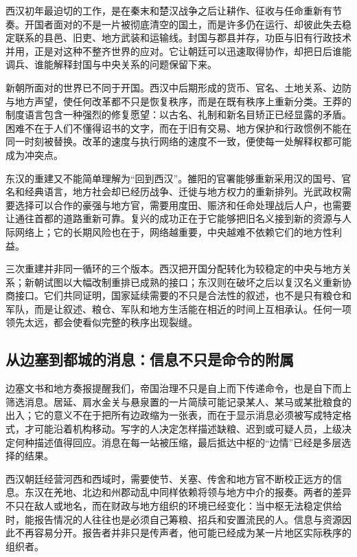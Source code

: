 西汉初年最迫切的工作，是在秦末和楚汉战争之后让耕作、征收与任命重新有节奏。开国者面对的不是一片被彻底清空的国土，而是许多仍在运行、却彼此失去稳定联系的县邑、旧吏、地方武装和运输线。封国与郡县并存，功臣与旧有行政技术并用，正是对这种不整齐世界的应对。它让朝廷可以迅速取得协作，却把日后谁能调兵、谁能解释封国与中央关系的问题保留下来。

新朝所面对的世界已不同于开国。西汉中后期形成的货币、官名、土地关系、边防与地方声望，使任何改革都不只是恢复秩序，而是在既有秩序上重新分类。王莽的制度语言包含一种强烈的修复愿望：以古名、礼制和新名目矫正已经显露的矛盾。困难不在于人们不懂得诏书的文字，而在于旧有交易、地方保护和行政惯例不能在同一时刻被替换。改革的速度与执行网络的速度不一致，便使每一处解释权都可能成为冲突点。

东汉的重建又不能简单理解为“回到西汉”。雒阳的官署能够重新采用汉的国号、官名和经典语言，地方社会却已经历战争、迁徙与地方权力的重新排列。光武政权需要选择可以合作的豪强与地方官，需要用度田、赈济和任命处理战后人户，也需要让通往首都的道路重新可靠。复兴的成功正在于它能够把旧名义接到新的资源与人际网络上；它的长期风险也在于，网络越重要，中央越难不依赖它们的地方性利益。

三次重建并非同一循环的三个版本。西汉把开国分配转化为较稳定的中央与地方关系；新朝试图以大幅改制重排已成熟的接口；东汉则在破坏之后以复汉名义重新协商接口。它们共同证明，国家延续需要的不只是合法性的叙述，也不是只有粮仓和军队，而是让叙述、粮仓、军队和地方生活能在相近的时间上互相承认。任何一项领先太远，都会使看似完整的秩序出现裂缝。

\subsection{从边塞到都城的消息：信息不只是命令的附属}

边塞文书和地方奏报提醒我们，帝国治理不只是自上而下传递命令，也是自下而上筛选消息。居延、肩水金关与悬泉置的一片简牍可能记录某人、某马或某批粮食的出入；它的意义不在于把所有边政缩为一张表，而在于显示消息必须被写成特定格式，才可能沿着机构移动。写字的人决定怎样描述缺粮、迟到或可疑人员，上级决定何种描述值得回应。消息在每一站被压缩，最后抵达中枢的“边情”已经是多层选择的结果。

西汉朝廷经营河西和西域时，需要使节、关塞、传舍和地方官不断校正远方的信息。东汉在羌地、北边和州郡动乱中同样依赖将领与地方中介的报奏。两者的差异不只在敌人或地名，而在财政与地方组织的环境已经变化：当中枢无法稳定供给时，能报告情况的人往往也是必须自己筹粮、招兵和安置流民的人。信息与资源因此不再容易分开。报告者并非只是传声者，他可能已经成为某一片地区实际秩序的组织者。

